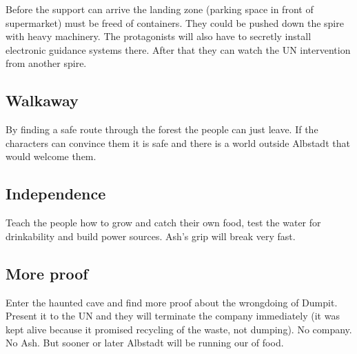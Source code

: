 Before the support can arrive the landing zone (parking space in front of supermarket) must be freed of containers. They could be pushed down the spire with heavy machinery. The protagonists will also have to secretly install electronic guidance systems there. After that they can watch the UN intervention from another spire.

\subsection{Walkaway}

By finding a safe route through the forest the people can just leave. If the characters can convince them it is safe and there is a world outside Albstadt that would welcome them.

\subsection{Independence}

Teach the people how to grow and catch their own food, test the water for drinkability and build power sources. Ash's grip will break very fast.

\subsection{More proof}

Enter the haunted cave and find more proof about the wrongdoing of Dumpit. Present it to the UN and they will terminate the company immediately (it was kept alive because it promised recycling of the waste, not dumping). No company. No Ash. But sooner or later Albstadt will be running our of food.
